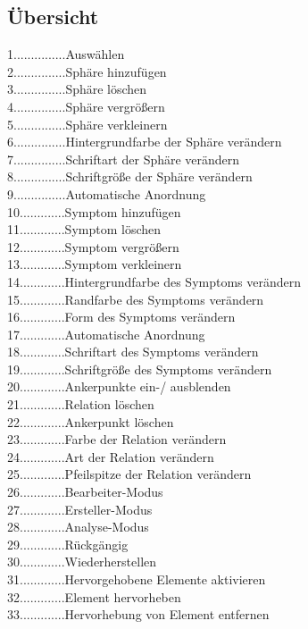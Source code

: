 \documentclass[enabledeprecatedfontcommands,fontsize=11pt,paper=a4,twoside]{scrartcl}
\newcommand*{\hdo}{.............}
\begin{document}
\subsection{Übersicht}
1\hdo..Auswählen \\
2\hdo..Sphäre hinzufügen \\
3\hdo..Sphäre löschen \\
4\hdo..Sphäre vergrößern \\
5\hdo..Sphäre verkleinern \\
6\hdo..Hintergrundfarbe der Sphäre verändern  \\
7\hdo..Schriftart der Sphäre verändern  \\
8\hdo..Schriftgröße der Sphäre verändern \\
9\hdo..Automatische Anordnung \\
10\hdo  Symptom hinzufügen \\
11\hdo  Symptom löschen \\
12\hdo  Symptom vergrößern \\
13\hdo  Symptom verkleinern \\
14\hdo  Hintergrundfarbe des Symptoms verändern \\
15\hdo  Randfarbe des Symptoms verändern \\
16\hdo  Form des Symptoms verändern \\
17\hdo  Automatische Anordnung \\
18\hdo  Schriftart des Symptoms verändern \\
19\hdo  Schriftgröße des Symptoms verändern \\
20\hdo  Ankerpunkte ein-/ ausblenden \\
21\hdo  Relation löschen \\
22\hdo  Ankerpunkt löschen \\
23\hdo  Farbe der Relation verändern \\
24\hdo  Art der Relation  verändern \\
25\hdo  Pfeilspitze der Relation verändern \\
26\hdo Bearbeiter-Modus\\
27\hdo Ersteller-Modus\\
28\hdo Analyse-Modus\\
29\hdo Rückgängig \\
30\hdo Wiederherstellen\\
31\hdo Hervorgehobene Elemente aktivieren\\
32\hdo Element hervorheben\\
33\hdo Hervorhebung von Element entfernen\\
\end{document}
